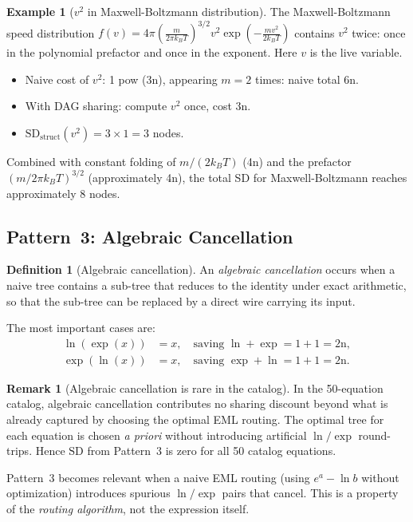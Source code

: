 \documentclass[12pt,a4paper]{article}
\theoremstyle{definition}
\newtheorem{definition}[theorem]{Definition}
\newtheorem{remark}[theorem]{Remark}
\newtheorem{example}[theorem]{Example}
\newcommand{\SD}{\mathrm{SD}}
\begin{document}
\begin{example}[$v^2$ in Maxwell-Boltzmann distribution]
The Maxwell-Boltzmann speed distribution
$f(v) = 4\pi \left(\frac{m}{2\pi k_B T}\right)^{3/2} v^2 \exp\!\left(-\frac{mv^2}{2k_BT}\right)$
contains $v^2$ twice: once in the polynomial prefactor and once in the
exponent.  Here $v$ is the live variable.
\begin{itemize}[noitemsep]
  \item Naive cost of $v^2$: 1 pow (3n), appearing $m = 2$ times: naive total $6$n.
  \item With DAG sharing: compute $v^2$ once, cost 3n.
  \item $\SD_{\mathrm{struct}}(v^2) = 3 \times 1 = 3$ nodes.
\end{itemize}
Combined with constant folding of $m/(2k_BT)$ (4n) and the prefactor
$(m/2\pi k_BT)^{3/2}$ (approximately 4n), the total SD for Maxwell-Boltzmann
reaches approximately 8 nodes.
\end{example}

\subsection{Pattern~3: Algebraic Cancellation}
\label{sec:p3}

\begin{definition}[Algebraic cancellation]
An \emph{algebraic cancellation} occurs when a naive tree contains a
sub-tree that reduces to the identity under exact arithmetic, so that
the sub-tree can be replaced by a direct wire carrying its input.
\end{definition}

The most important cases are:
\begin{align}
  \ln(\exp(x)) &= x, \quad \text{saving } \ln + \exp = 1 + 1 = 2\text{n}, \\
  \exp(\ln(x)) &= x, \quad \text{saving } \exp + \ln = 1 + 1 = 2\text{n}.
\end{align}

\begin{remark}[Algebraic cancellation is rare in the catalog]
In the 50-equation catalog, algebraic cancellation contributes no sharing
discount beyond what is already captured by choosing the optimal EML
routing.  The optimal tree for each equation is chosen \emph{a priori}
without introducing artificial $\ln/\exp$ round-trips.  Hence $\SD$ from
Pattern~3 is zero for all 50 catalog equations.

Pattern~3 becomes relevant when a naive EML routing (using $e^a - \ln b$
without optimization) introduces spurious $\ln/\exp$ pairs that cancel.
This is a property of the \emph{routing algorithm}, not the expression itself.
\end{remark}
\end{document}
